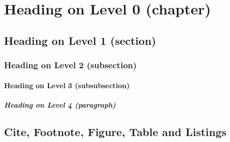 \chapter{Heading on Level 0 (chapter)}\label{chapter1} 

\lipsum[1]


\section{Heading on Level 1 (section)}

\lipsum[2]


\subsection{Heading on Level 2 (subsection)}

\lipsum[3]


\subsubsection{Heading on Level 3 (subsubsection)}

\lipsum[4]


\paragraph{Heading on Level 4 (paragraph)}

\lipsum[5]


\section{Cite, Footnote, Figure, Table and Listings}

